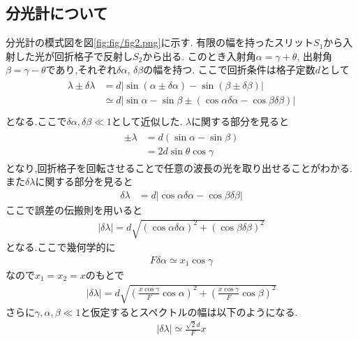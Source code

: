 \subsection{分光計について\cite{jikken}}
分光計の模式図を図\ref{fig:fig/fig2.png}に示す.
有限の幅を持ったスリット$S_1$から入射した光が回折格子で反射し$S_2$から出る.
このとき入射角$\alpha=\gamma+\theta$, 出射角$\beta=\gamma-\theta$であり,それぞれ$\delta\alpha$, $\delta\beta$の幅を持つ.
ここで回折条件は格子定数$d$として
\begin{align}
  \begin{split}
    \lambda\pm\delta\lambda&=d|\sin(\alpha\pm\delta\alpha)-\sin(\beta\pm\delta\beta)|\\
    &\simeq d|\sin\alpha-\sin\beta\pm(\cos\alpha\delta\alpha-\cos\beta\delta\beta)|\\
  \end{split}
\end{align}
となる.ここで$\delta\alpha,\delta\beta\ll1$として近似した.
$\lambda$に関する部分を見ると
\begin{align}
  \begin{split}
    \pm\lambda&=d(\sin\alpha-\sin\beta)\\
    &=2d\sin\theta\cos\gamma
  \end{split}
\end{align}
となり,回折格子を回転させることで任意の波長の光を取り出せることがわかる.
また$\delta\lambda$に関する部分を見ると
\begin{align}
    \delta\lambda&=d|\cos\alpha\delta\alpha-\cos\beta\delta\beta|
\end{align}
ここで誤差の伝搬則を用いると
\begin{align}
  |\delta\lambda|=d\sqrt{(\cos\alpha\delta\alpha)^2+(\cos\beta\delta\beta)^2}
\end{align}
となる.ここで幾何学的に
\begin{align}
  F\delta\alpha\simeq x_1\cos\gamma
\end{align}
なので$x_1=x_2=x$のもとで
\begin{align}
  |\delta\lambda|=d\sqrt{\left(\frac{x\cos\gamma}{F}\cos\alpha\right)^2+\left(\frac{x\cos\gamma}{F}\cos\beta\right)^2}
\end{align}
さらに$\gamma,\alpha,\beta\ll1$と仮定するとスペクトルの幅は以下のようになる.
\begin{align}
  \label{equ:|deltalambda|}
  |\delta\lambda|\simeq \frac{\sqrt{2}d}{F}x
\end{align}

